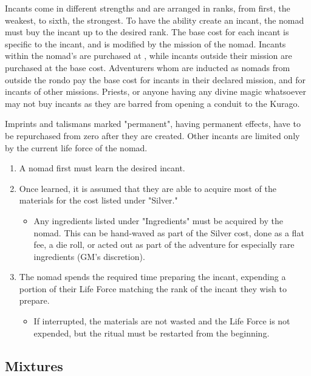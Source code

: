 \begin{multicols*}{2}
Incants come in different strengths and are arranged in ranks, from first, the weakest, to sixth, the strongest. To have the ability create an incant, the nomad must buy the incant up to the desired rank. The base cost for each incant is specific to the incant, and is modified by the mission of the nomad. Incants within the nomad's  are purchased at , while incants outside their mission are purchased at  the base cost.
Adventurers whom are inducted as nomads from outside the rondo pay  the base cost for incants in their declared mission, and  for incants
of other missions. Priests, or anyone having any divine magic whatsoever may not buy incants as they are barred from opening a conduit to the Kurago.

Imprints and talismans marked "permanent", having permanent effects, have to be repurchased from zero after they are created. Other incants are limited only by the current life force of the nomad.\\

\begin{normboxlist}
\begin{enumerate}
\item A nomad first must learn the desired incant.
\item Once learned, it is assumed that they are able to acquire most of the materials for the cost listed under "Silver."
\begin{itemize}
\item[] Any ingredients listed under "Ingredients" must be acquired by the nomad. This can be hand-waved as part of the Silver cost, done as a flat fee, a die roll, or acted out as part of the adventure for especially rare ingredients (GM's discretion). 
\end{itemize}
\item The nomad spends the required time preparing the incant, expending a portion of their Life Force matching the rank of the incant they wish to prepare.
\begin{itemize}
\item[] If interrupted, the materials are not wasted and the Life Force is not expended, but the ritual must be restarted from the beginning.
\end{itemize}
\end{enumerate}
\end{normboxlist}

\subsection{Mixtures}


\end{multicols*}
